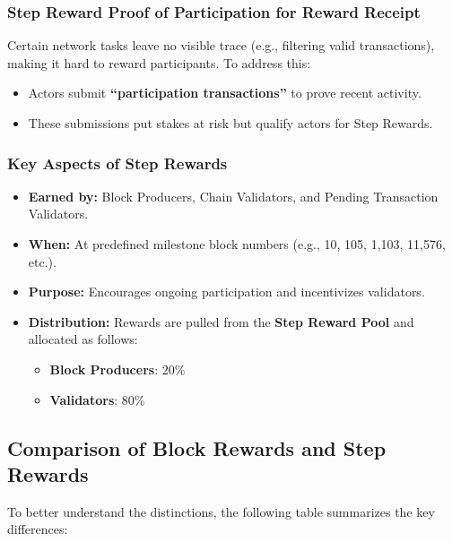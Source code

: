 \documentclass{article}
\begin{document}
\subsubsection{Step Reward Proof of Participation for Reward Receipt}

Certain network tasks leave no visible trace (e.g., filtering valid
transactions), making it hard to reward participants. To address this:
\begin{itemize}
    \item Actors submit \textbf{“participation transactions”} to prove recent activity.
    \item These submissions put stakes at risk but qualify actors for Step Rewards.
\end{itemize}

\subsubsection{Key Aspects of Step Rewards}
\begin{itemize}
    \item \textbf{Earned by:} Block Producers, Chain Validators, and Pending Transaction Validators.
    \item \textbf{When:} At predefined milestone block numbers (e.g., 10, 105, 1,103, 11,576, etc.).
    \item \textbf{Purpose:} Encourages ongoing participation and incentivizes validators.
    \item \textbf{Distribution:} Rewards are pulled from the \textbf{Step Reward Pool} and allocated as follows:
          \begin{itemize}
              \item \textbf{Block Producers}: 20\%
              \item \textbf{Validators}: 80\%
          \end{itemize}
\end{itemize}

\subsection{Comparison of Block Rewards and Step Rewards}

To better understand the distinctions, the following table summarizes the key
differences:
\end{document}
